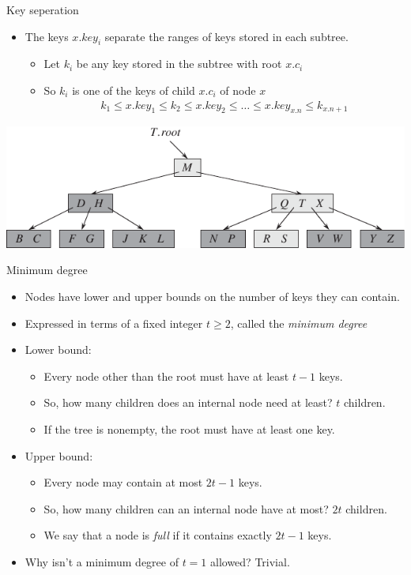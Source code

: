 \documentclass[11pt,t]{beamer}
\begin{document}
	\begin{frame}{Key seperation}
		\begin{itemize}[<+->]
			\item The keys \(x.key_i\) separate the ranges of keys stored in each subtree. \begin{itemize}[<+->]
				\item Let \(k_i\) be any key stored in the subtree with root \(x.c_i\)
				\item So \(k_i\) is one of the keys of child \(x.c_i\) of node \(x\)\onslide<+-> \begin{align*}
					k_1 \leq x.key_1 \leq k_2 \leq x.key_2 \leq \ldots \leq x.key_{x.n} \leq k_{x.n+1}
				\end{align*}
			\end{itemize}
		\end{itemize}
		\onslide<+-> \centering \includegraphics[width=.7\textwidth]{images/letters}
	\end{frame}

	\begin{frame}{Minimum degree}
		\begin{itemize}[<+->]
			\item Nodes have lower and upper bounds on the number of keys they can contain.
			\item Expressed in terms of a fixed integer \(t \geq 2\), called the \textit{minimum degree}
			\item Lower bound: \begin{itemize}[<+->\enspace]
				\item Every node other than the root must have at least \(t-1\) keys.
				\item So, how many children does an internal node need at least? \onslide<+-> \(t\) children.
				\item If the tree is nonempty, the root must have at least one key.
			\end{itemize}
			\item Upper bound: \begin{itemize}[<+->\enspace]
				\item Every node may contain at most \(2t-1\) keys.
				\item So, how many children can an internal node have at most? \onslide<+-> \(2t\) children.
				\item We say that a node is \textit{full} if it contains exactly \(2t-1\) keys.
			\end{itemize}
			\item Why isn’t a minimum degree of \(t=1\) allowed? \onslide<+-> Trivial.
		\end{itemize}
	\end{frame}
\end{document}
